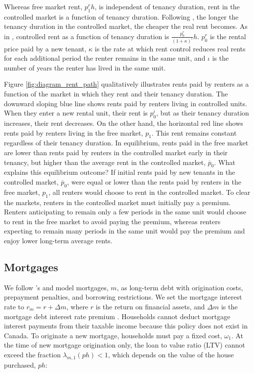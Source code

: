 \documentclass[parskip=full]{article}
\begin{document}
Whereas free market rent, $p^{r}_{1}h$, is independent of tenancy duration, rent in the controlled market is a function of tenancy duration. Following \citet{fmn-2022}, the longer the tenancy duration in the controlled market, the cheaper the real rent becomes. As in \citet{fmn-2022}, controlled rent as a function of tenancy duration is $\frac{p^{r}_{0}}{(1+\kappa)^{\iota}} h$. $p^{r}_{0}$ is the rental price paid by a new tenant, $\kappa$ is the rate at which rent control reduces real rents for each additional period the renter remains in the same unit, and $\iota$ is the number of years the renter has lived in the same unit. 

Figure \ref{fig:diagram_rent_path} qualitatively illustrates rents paid by renters as a function of the market in which they rent and their tenancy duration. The downward sloping blue line shows rents paid by renters living in controlled units. When they enter a new rental unit, their rent is $p^{i}_{0}$, but as their tenancy duration increases, their rent decreases. On the other hand, the horizontal red line shows rents paid by renters living in the free market, $p_{1}$. This rent remains constant regardless of their tenancy duration. In equilibrium, rents paid in the free market are lower than rents paid by renters in the controlled market early in their tenancy, but higher than the average rent in the controlled market, $\overline{p}_{0}$. What explains this equilibrium outcome? If initial rents paid by new tenants in the controlled market, $\overline{p}_{0}$, were equal or lower than the rents paid by renters in the free market, $p_{1}$, all renters would choose to rent in the controlled market. To clear the markets, renters in the controlled market must initially pay a premium. Renters anticipating to remain only a few periods in the same unit would choose to rent in the free market to avoid paying the premium, whereas renters expecting to remain many periods in the same unit would pay the premium and enjoy lower long-term average rents.

\subsection{Mortgages}\label{subsection:morgtages}

We follow \citet{rs-2023}'s and model mortgages, $m$, as long-term debt with origination costs, prepayment penalties, and borrowing restrictions.  We set the mortgage interest rate to $r_{m}=r+\Delta m$, where $r$ is the return on financial assets, and $\Delta m$ is the mortgage debt interest rate premium \citep{sommeretal-2013,sommersullivan-2017,kaplanetal-2019}. Households cannot deduct mortgage interest payments from their taxable income because this policy does not exist in Canada. To originate a new mortgage, households must pay a fixed cost, $\omega_{1}$. At the time of new mortgage origination only, the loan to value ratio (LTV) cannot exceed the fraction $\lambda_{m,1}(ph)<1$, which depends on the value of the house purchased, $ph$:
\end{document}
